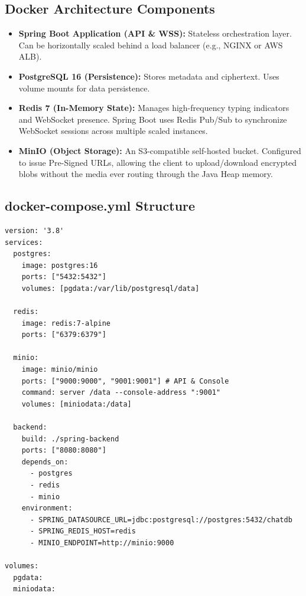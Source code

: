 \documentclass[12pt, a4paper]{article}
\begin{document}
\subsection{Docker Architecture Components}
\begin{itemize}
    \item \textbf{Spring Boot Application (API \& WSS):} Stateless orchestration layer. Can be horizontally scaled behind a load balancer (e.g., NGINX or AWS ALB).
    \item \textbf{PostgreSQL 16 (Persistence):} Stores metadata and ciphertext. Uses volume mounts for data persistence.
    \item \textbf{Redis 7 (In-Memory State):} Manages high-frequency typing indicators and WebSocket presence. Spring Boot uses Redis Pub/Sub to synchronize WebSocket sessions across multiple scaled instances.
    \item \textbf{MinIO (Object Storage):} An S3-compatible self-hosted bucket. Configured to issue Pre-Signed URLs, allowing the client to upload/download encrypted blobs without the media ever routing through the Java Heap memory.
\end{itemize}

\subsection{docker-compose.yml Structure}
\begin{lstlisting}[title={Service Network Topology}]
version: '3.8'
services:
  postgres:
    image: postgres:16
    ports: ["5432:5432"]
    volumes: [pgdata:/var/lib/postgresql/data]
    
  redis:
    image: redis:7-alpine
    ports: ["6379:6379"]
    
  minio:
    image: minio/minio
    ports: ["9000:9000", "9001:9001"] # API & Console
    command: server /data --console-address ":9001"
    volumes: [miniodata:/data]
    
  backend:
    build: ./spring-backend
    ports: ["8080:8080"]
    depends_on:
      - postgres
      - redis
      - minio
    environment:
      - SPRING_DATASOURCE_URL=jdbc:postgresql://postgres:5432/chatdb
      - SPRING_REDIS_HOST=redis
      - MINIO_ENDPOINT=http://minio:9000
      
volumes:
  pgdata:
  miniodata:
\end{lstlisting}
\end{document}
